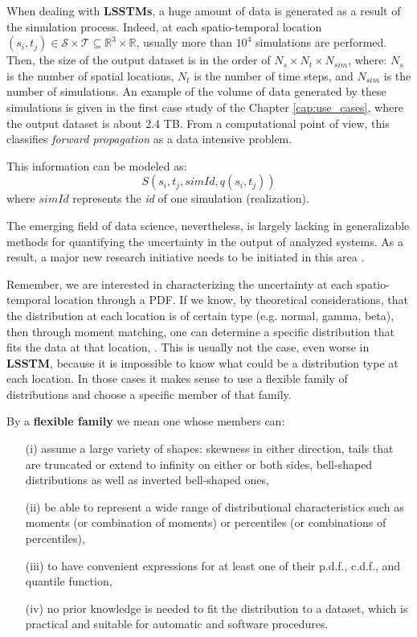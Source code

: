 When dealing with \textbf{LSSTMs}, a huge amount of data is generated as a result of the simulation process. Indeed, at each spatio-temporal location $(s_{i},t_{j}) \in \mathcal{S} \times \mathcal{T}\subseteq\mathbb{R}^{3}\times\mathbb{R}$, usually more than $10^4$ simulations are performed. Then, the size of the output dataset is in the order of $N_{s}\times N_{t}\times N_{sim}$, where: $N_{s}$ is the number of spatial locations, $N_{t}$ is the number of time steps, and $N_{sim}$ is the number of simulations.  An example of the volume of data generated by these simulations is given in the first case study of the Chapter \ref{cap:use_cases}, where the output dataset is about 2.4 TB. From a computational point of view, this classifies \textit{forward propagation} as a data intensive problem.

This information can be modeled as:
\begin{equation}\label{eq:data_base_structure}
S(s_{i},t_{j},simId,q(s_{i},t_{j}))
\end{equation}
where $simId$ represents the \textit{id} of one simulation (realization).

The emerging field of data science, nevertheless, is largely lacking in generalizable methods for quantifying the uncertainty in the output of analyzed systems. As a result, a major new research initiative needs to be initiated in this area \cite{Tobergte2013}.

Remember, we are interested in characterizing the uncertainty at each spatio-temporal location through a PDF. If we know, by theoretical considerations, that the distribution at each location is of certain type (e.g. normal, gamma, beta), then through moment matching, one can determine a specific distribution that fits the data at that location, \cite{Karian2011, Mustafa2016}. This is usually not the case, even worse in \textbf{LSSTM}, because it is impossible to know what could be a distribution type at each location. In those cases it makes sense to use a flexible family of distributions and choose a specific member of that family.

By a \textbf{flexible family} we mean one whose members can:

\begin{itemize}
\item[(i)] assume a large variety of shapes: skewness in either direction, tails that are truncated or extend to infinity on either or both sides, bell-shaped distributions as well as inverted bell-shaped ones,
\item[(ii)] be able to represent a wide range of distributional characteristics such as moments (or combination of moments) or percentiles (or combinations of percentiles),
\item[(iii)] to have convenient expressions for at least one of their p.d.f., c.d.f., and quantile function,
\item[(iv)] no prior knowledge is needed to fit the distribution to a dataset, which is practical and suitable for automatic and software procedures.
\end{itemize} 

